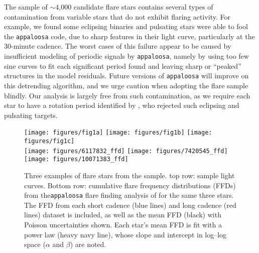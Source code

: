 \documentclass[preprint2]{aastex62}
\begin{document}
The \citet{davenport2016} sample of $\sim$4,000 candidate flare stars contains several types of contamination from variable stars that do not exhibit flaring activity. For example, we found some eclipsing binaries and pulsating stars were able to fool the {\tt appaloosa} code, due to sharp features in their light curve, particularly at the 30-minute cadence. The worst cases of this failure appear to be caused by insufficient modeling of periodic signals by {\tt appaloosa}, namely by using too few sine curves to fit each significant period found and leaving sharp or ``peaked'' structures in the model residuals. Future versions of {\tt appaloosa} will improve on this detrending algorithm, and we urge caution when adopting the \citet{davenport2016} flare sample blindly. Our analysis is largely free from such contamination, as we require each star to have a rotation period identified by \citet{mcquillan2014}, who rejected such eclipsing and pulsating targets.


\begin{figure*}[!t]
\centering
\texttt{[image: figures/fig1a]}
\texttt{[image: figures/fig1b]}
\texttt{[image: figures/fig1c]}\\
\texttt{[image: figures/6117832\_ffd]}
\texttt{[image: figures/7420545\_ffd]}
\texttt{[image: figures/10071383\_ffd]}
\caption{
Three examples of flare stars from the \citet{davenport2016} sample. top row: sample light curves. Bottom row: cumulative flare frequency distributions (FFDs) from the{\tt appaloosa} flare finding analysis of \citet{davenport2016} for the same three stars. The FFD from each short cadence (blue lines) and long cadence (red lines) dataset is included, as well as the mean FFD (black) with Poisson uncertainties shown. Each star's mean FFD is fit with a power law (heavy navy line), whose slope and intercept in log--log space ($\alpha$ and $\beta$) are noted.
}
\label{fig:ffd1}
\end{figure*}
\end{document}

